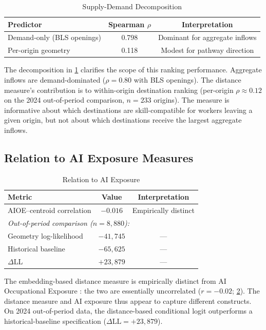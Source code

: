 \documentclass[12pt]{article}
\begin{document}
\begin{table}[h!]
\centering
\caption{Supply-Demand Decomposition}
\label{tab:demand-decomposition}
\begin{tabular}{lcc}
\toprule
\textbf{Predictor} & \textbf{Spearman $\rho$} & \textbf{Interpretation} \\
\midrule
Demand-only (BLS openings) & 0.798 & Dominant for aggregate inflows \\
Per-origin geometry & 0.118 & Modest for pathway direction \\
\bottomrule
\end{tabular}
\end{table}


The decomposition in \cref{tab:demand-decomposition} clarifies the scope of this ranking performance. Aggregate inflows are demand-dominated ($\rho = 0.80$ with BLS openings). The distance measure's contribution is to within-origin destination ranking (per-origin $\rho \approx 0.12$ on the 2024 out-of-period comparison, $n = 233$ origins). The measure is informative about which destinations are skill-compatible for workers leaving a given origin, but not about which destinations receive the largest aggregate inflows.


\subsection{Relation to AI Exposure Measures}
\label{subsec:shock-integration}


\begin{table}[h!]
\centering
\caption{Relation to AI Exposure}
\label{tab:shock-integration}
\begin{tabular}{lcc}
\toprule
\textbf{Metric} & \textbf{Value} & \textbf{Interpretation} \\
\midrule
AIOE--centroid correlation & $-0.016$ & Empirically distinct \\
\midrule
\multicolumn{3}{l}{\textit{Out-of-period comparison ($n = 8{,}880$):}} \\
Geometry log-likelihood & $-41{,}745$ & --- \\
Historical baseline & $-65{,}625$ & --- \\
$\Delta$LL & $+23{,}879$ & --- \\
\bottomrule
\end{tabular}
\end{table}


The embedding-based distance measure is empirically distinct from AI Occupational Exposure \citep{FeltenRajSeamans2021}: the two are essentially uncorrelated ($r = -0.02$; \cref{tab:shock-integration}). The distance measure and AI exposure thus appear to capture different constructs. On 2024 out-of-period data, the distance-based conditional logit outperforms a historical-baseline specification ($\Delta \text{LL} = +23{,}879$).
\end{document}
